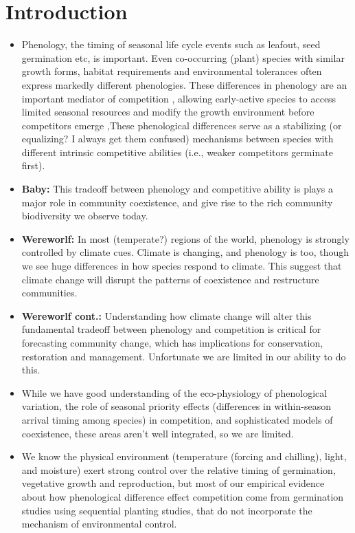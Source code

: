\documentclass{article}[12pt]
\begin{document}


\section{Introduction}
\begin{itemize}
\item Phenology, the timing of seasonal life cycle events such as leafout, seed germination etc, is important. Even co-occurring (plant) species with similar growth forms, habitat requirements and environmental tolerances often express markedly different phenologies. These differences in phenology are an important mediator of competition \citep{}, allowing early-active species to access limited seasonal resources and modify the growth environment before competitors emerge \citep{Kardol2013},These phenological differences serve as a stabilizing (or equalizing? I always get them confused) mechanisms between species with different intrinsic competitive abilities (i.e., weaker competitors germinate first).


\item \textbf{Baby:} This tradeoff between phenology and competitive ability is plays a major role in community coexistence, and give rise to the rich community biodiversity we observe today. 

\item \textbf{Wereworlf:} In most (temperate?) regions of the world, phenology is strongly controlled by climate cues. Climate is changing, and phenology is too, though we see huge differences in how species respond to climate. This suggest that climate change will disrupt the patterns of coexistence and restructure communities.

\item \textbf{Wereworlf cont.:} Understanding how climate change will alter this fundamental tradeoff between phenology and competition is critical for forecasting community change, which has implications for conservation, restoration and management. Unfortunate we are limited in our ability to do this.

\item While we have good understanding of the eco-physiology of phenological variation, the role of seasonal priority effects (differences in within-season arrival timing among species) in competition, and sophisticated models of coexistence, these areas aren't well integrated, so we are limited.

\item We know the physical environment (temperature (forcing and chilling), light, and moisture) exert strong control over the relative timing of germination, vegetative growth and reproduction, but most of our empirical evidence about how phenological difference effect competition come from germination studies using sequential planting studies, that do not incorporate the mechanism of environmental control. 


\end{itemize}
\end{document}
